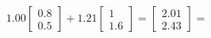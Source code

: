 \documentclass[preview]{standalone}
\begin{document}
\begin{align*}
1.00 \begin{bmatrix} 0.8 \\ 0.5 \end{bmatrix} + 1.21 \begin{bmatrix} 1 \\ 1.6 \end{bmatrix} = \begin{bmatrix} 2.01 \\ 2.43 \end{bmatrix} =
\end{align*}
\end{document}
